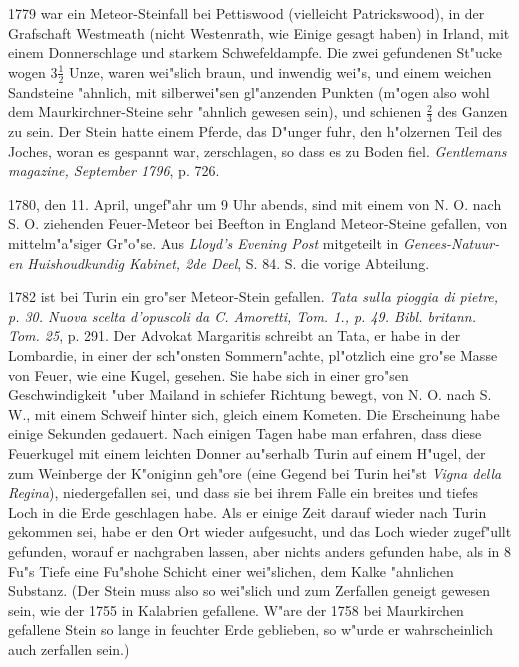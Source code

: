 \documentclass[a4paper, 11pt, oneside, polutonikogreek, german]{article}
\begin{document}
1779 war ein Meteor-Steinfall bei Pettiswood (vielleicht Patrickswood), in der Grafschaft Westmeath (nicht Westenrath, wie Einige gesagt haben) in Irland, mit einem Donnerschlage und starkem Schwefeldampfe. Die zwei gefundenen St"ucke wogen $\mathfrak{3\frac{1}{2}}$ Unze, waren wei"slich braun, und inwendig wei"s, und einem weichen Sandsteine "ahnlich, mit silberwei"sen gl"anzenden Punkten (m"ogen also wohl dem Maurkirchner-Steine sehr "ahnlich gewesen sein), und schienen $\mathfrak{\frac{2}{3}}$ des Ganzen zu sein. Der Stein hatte einem Pferde, das D"unger fuhr, den h"olzernen Teil des Joches, woran es gespannt war, zerschlagen, so dass es zu Boden fiel. \emph{Gentlemans magazine, September 1796}, p. 726.

1780, den 11. April, ungef"ahr um 9 Uhr abends, sind mit einem von N. O. nach S. O. ziehenden Feuer-Meteor bei Beefton in England Meteor-Steine gefallen, von mittelm"a"siger Gr"o"se. Aus \emph{Lloyd's Evening Post} mitgeteilt in \emph{Genees-Natuur-en Huishoudkundig Kabinet, 2de Deel}, S. 84. S. die vorige Abteilung.

1782 ist bei Turin ein gro"ser Meteor-Stein gefallen. \emph{Tata sulla pioggia di pietre, p. 30. Nuova scelta d'opuscoli da C. Amoretti, Tom. 1., p. 49. Bibl. britann. Tom. 25}, p. 291. Der Advokat Margaritis schreibt an Tata, er habe in der Lombardie, in einer der sch"onsten Sommern"achte, pl"otzlich eine gro"se Masse von Feuer, wie eine Kugel, gesehen. Sie habe sich in einer gro"sen Geschwindigkeit "uber Mailand in schiefer Richtung bewegt, von N. O. nach S. W., mit einem Schweif hinter sich, gleich einem Kometen. Die Erscheinung habe einige Sekunden gedauert. Nach einigen Tagen habe man erfahren, dass diese Feuerkugel mit einem leichten Donner au"serhalb Turin auf einem H"ugel, der zum Weinberge der K"oniginn geh"ore (eine Gegend bei Turin hei"st \emph{Vigna della Regina}), niedergefallen sei, und dass sie bei ihrem Falle ein breites und tiefes Loch in die Erde geschlagen habe. Als er einige Zeit darauf wieder nach Turin gekommen sei, habe er den Ort wieder aufgesucht, und das Loch wieder zugef"ullt gefunden, worauf er nachgraben lassen, aber nichts anders gefunden habe, als in 8 Fu"s Tiefe eine Fu"shohe Schicht einer wei"slichen, dem Kalke "ahnlichen Substanz. (Der Stein muss also so wei"slich und zum Zerfallen geneigt gewesen sein, wie der 1755 in Kalabrien gefallene. W"are der 1758 bei Maurkirchen gefallene Stein so lange in feuchter Erde geblieben, so w"urde er wahrscheinlich auch zerfallen sein.)
\end{document}
